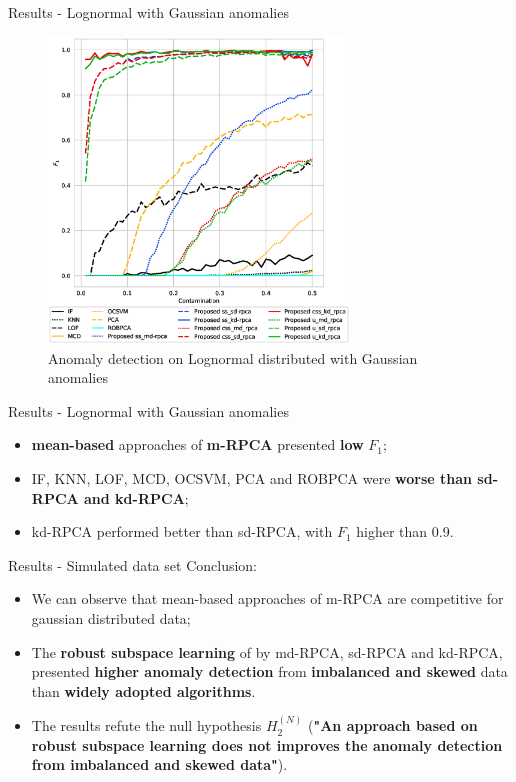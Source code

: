 \documentclass[newPxFont, numfooter, sectionpages]{beamer}
\begin{document}
\begin{frame}[c]{Results - Lognormal with Gaussian anomalies}
    \begin{figure}[h!]
    	\centering
    	\includegraphics[width=8cm]{figures/ch4/lognormal_f1_contamination.eps}
    	\caption{Anomaly detection on Lognormal distributed with Gaussian anomalies}
    	\label{fig:4.12}
    \end{figure}
\end{frame}

\begin{frame}[c]{Results - Lognormal with Gaussian anomalies}
	\begin{itemize}
		\item \textbf{mean-based} approaches of \textbf{m-RPCA} presented \textbf{low} $F_1$;
		\item IF, KNN, LOF, MCD, OCSVM, PCA and ROBPCA were \textbf{worse than sd-RPCA and kd-RPCA};
		\item kd-RPCA performed better than sd-RPCA, with $F_1$ higher than 0.9.
	\end{itemize}
\end{frame}

\begin{frame}[c]{Results - Simulated data set}
    Conclusion:
    \begin{itemize}
        \item We can observe that mean-based approaches of m-RPCA are competitive for gaussian distributed data;
        \item The \textbf{robust subspace learning} of by md-RPCA, sd-RPCA and kd-RPCA, presented \textbf{higher anomaly detection} from \textbf{imbalanced and skewed} data than \textbf{widely adopted algorithms}. 
        \item The results refute the null hypothesis $H_2^{(N)}$ (\textbf{"An approach based on robust subspace learning does not improves the anomaly detection from imbalanced and skewed data"}).
	\end{itemize}
\end{frame}
\end{document}
